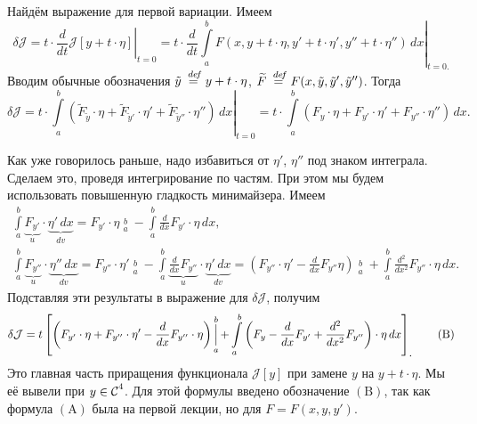 \documentclass[12pt,a4paper,openany,fleqn]{book}
\newcommand {\defeq}{\stackrel{\hspace{0.09 cm}de\!f}{=}}
\newcommand {\eqdef}{\defeq}
\newcommand{\Cf}{\ensuremath{\mathcal{C}}}
\newcommand{\J}{\ensuremath{\mathcal{J}}}
\newcommand{\Cfn}[2][]{\ensuremath{\Cf{\mathstrut}^{#2}_{#1}}}
\newcommand{\der}[2]{\ensuremath{\frac{d#1}{d#2}}}
\newcommand{\dder}[2]{\ensuremath{\frac{d^2#1}{d#2^2}}}
\theoremstyle{definition}
\begin{document}
	Найдём выражение для первой вариации. Имеем
	\begin{equation*}
	\delta\J=t\cdot\left.\der{}{t}\J[y+t\cdot\eta]\right|_{t=0}=t\cdot\left.\der{}{t}\int\limits_a^b F(x,y+t\cdot\eta,y'+t\cdot\eta',y''+t\cdot\eta'')\,dx\right|_{t=0\displaystyle.}
	\end{equation*}
	Вводим обычные обозначения $\tilde{y}\eqdef y+t\cdot\eta$, $\widetilde{F}\eqdef F(x,\tilde{y},\tilde{y}',\tilde{y}'')$. Тогда 
	\begin{equation*}
		\delta\J=t\cdot\left.\int\limits_a^b\left( \widetilde{F}_{\tilde{y}}\cdot\eta+\widetilde{F}_{\tilde{y}'}\cdot\eta'+\widetilde{F}_{\tilde{y}''}\cdot\eta''\right)\,dx\right|_{t=0}=t\cdot\int\limits_a^b \left(F_{y}\cdot\eta+F_{y'}\cdot\eta'+F_{y''}\cdot\eta''\right)\,dx.
	\end{equation*}
	
	Как уже говорилось раньше, надо избавиться от $\eta'$, $\eta''$ под знаком интеграла. Сделаем это, проведя интегрирование по частям. При этом мы будем использовать повышенную гладкость минимайзера. Имеем
	\begin{gather*}
		\int\limits_a^b \underbrace{F_{y'}}_{u}\cdot\underbrace{\eta'\,dx}_{dv}=F_{y'}\cdot\eta\mathop{\Big|}\limits_a^b-\int\limits_a^b\der{}{x}F_{y'}\cdot\eta\,dx,\\
		\int\limits_a^b \underbrace{F_{y''}}_{u}\cdot\underbrace{\eta''\,dx}_{dv}=F_{y''}\cdot\eta'\mathop{\Big|}\limits_a^b-\int\limits_a^b\underbrace{\der{}{x}F_{y''}}_{u}\cdot\underbrace{\eta'\,dx}_{dv}=\left(F_{y''}\cdot\eta'-\der{}{x}F_{y''}\eta\right)\mathop{\Big|}\limits_a^b+\int\limits_a^b\dder{}{x}F_{y''}\cdot\eta\,dx.
	\end{gather*}
	Подставляя эти результаты в выражение для $\delta\J$, получим 
	\begin{equation}
		\label{l3:eq:B}
		\hfill\delta\J=t\left[\left(F_{y'}\cdot\eta+F_{y''}\cdot\eta'-\der{}{x}F_{y''}\cdot\eta\right)\mathop{\Big|}\limits_a^b+\int\limits_a^b\left(F_{y}-\der{}{x}F_{y'}+\dder{}{x}F_{y''}\right)\cdot\eta\,dx\right]_{\displaystyle.}\tag{B}\hfill
	\end{equation}
	Это главная часть приращения функционала $\J[y]$ при замене $y$ на $y+t\cdot\eta$. Мы её вывели при $y\in\Cfn{4}$. Для этой формулы введено обозначение $(\text{B})$, так как формула $(\text{A})$ была на первой лекции, но для $F=F(x,y,y')$. 
	
\end{document}

